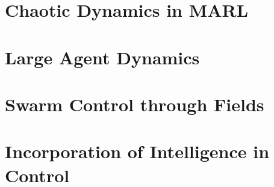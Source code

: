 \documentclass[.../main.tex]{subfiles}
\begin{document}
    \section{Chaotic Dynamics in MARL} \label{sec::Chaos_in_MARL}
    \section{Large Agent Dynamics} \label{sec::Large_Agent_Dynamics}
    \section{Swarm Control through Fields} \label{sec::Swarm_Field_Control}
    \section{Incorporation of Intelligence in Control} \label{sec::Intelligence_in_control}
\end{document}
